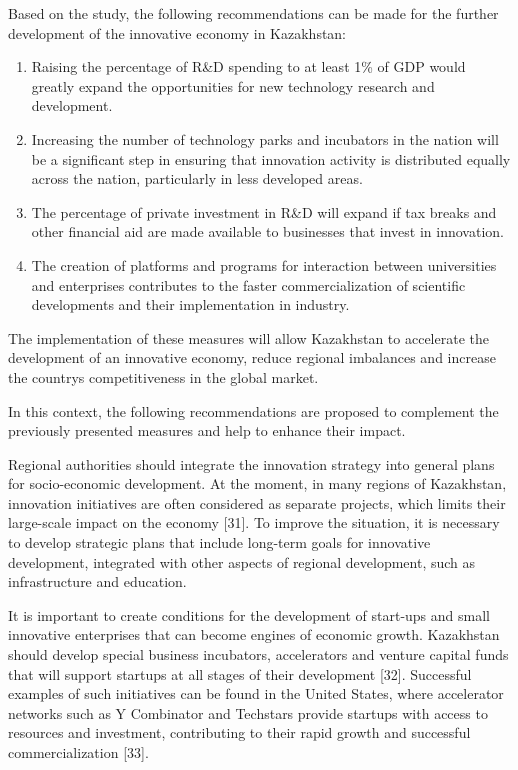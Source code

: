 Based on the study, the following recommendations can be made for the
further development of the innovative economy in Kazakhstan:

\begin{enumerate}
\def\labelenumi{\arabic{enumi}.}
\item
  Raising the percentage of R\&D spending to at least 1\% of GDP would
  greatly expand the opportunities for new technology research and
  development.
\item
  Increasing the number of technology parks and incubators in the nation
  will be a significant step in ensuring that innovation activity is
  distributed equally across the nation, particularly in less developed
  areas.
\item
  The percentage of private investment in R\&D will expand if tax breaks
  and other financial aid are made available to businesses that invest
  in innovation.
\item
  The creation of platforms and programs for interaction between
  universities and enterprises contributes to the faster
  commercialization of scientific developments and their implementation
  in industry.
\end{enumerate}

The implementation of these measures will allow Kazakhstan to accelerate
the development of an innovative economy, reduce regional imbalances and
increase the country\textquotesingle s competitiveness in the global
market.

In this context, the following recommendations are proposed to
complement the previously presented measures and help to enhance their
impact.

Regional authorities should integrate the innovation strategy into
general plans for socio-economic development. At the moment, in many
regions of Kazakhstan, innovation initiatives are often considered as
separate projects, which limits their large-scale impact on the economy
{[}31{]}. To improve the situation, it is necessary to develop strategic
plans that include long-term goals for innovative development,
integrated with other aspects of regional development, such as
infrastructure and education.

It is important to create conditions for the development of start-ups
and small innovative enterprises that can become engines of economic
growth. Kazakhstan should develop special business incubators,
accelerators and venture capital funds that will support startups at all
stages of their development {[}32{]}. Successful examples of such
initiatives can be found in the United States, where accelerator
networks such as Y Combinator and Techstars provide startups with access
to resources and investment, contributing to their rapid growth and
successful commercialization {[}33{]}.

